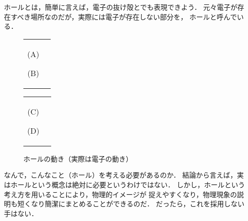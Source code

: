     ホールとは，簡単に言えば，電子の抜け殻とでも表現できよう．
    元々電子が存在すべき場所なのだが，実際には電子が存在しない部分を，
    ホールと呼んでいる．
       \begin{figure}[hbt]
           \begin{tabular}{cc}
               \begin{minipage}{0.5\hsize}
                   \begin{center}
                       {Comp_ElecHole_EleMov.pdf}

                       (A)
                   \end{center}
               \end{minipage}
               \begin{minipage}{0.5\hsize}
                   \begin{center}
                       {Comp_ElecHole_EleMov01.pdf}

                       (B)
                   \end{center}
               \end{minipage}
           \end{tabular}
       \end{figure}
       \begin{figure}[hbt]
           \begin{tabular}{cc}
               \begin{minipage}{0.5\hsize}
                   \begin{center}
                       {Comp_ElecHole_EleMov02.pdf}

                       (C)
                   \end{center}
               \end{minipage}
               \begin{minipage}{0.5\hsize}
                   \begin{center}
                       {Comp_ElecHole_EleMov03.pdf}

                        (D)
                   \end{center}
               \end{minipage}
           \end{tabular}
           \caption{ホールの動き（実際は電子の動き）}
       \end{figure}


    なんで，こんなこと（ホール）を考える必要があるのか．
    結論から言えば，実はホールという概念は絶対に必要というわけではない．
    しかし，ホールという考え方を用いることにより，物理的イメージが
    捉えやすくなり，物理現象の説明も短くなり簡潔にまとめることができるのだ．
    だったら，これを採用しない手はない．


